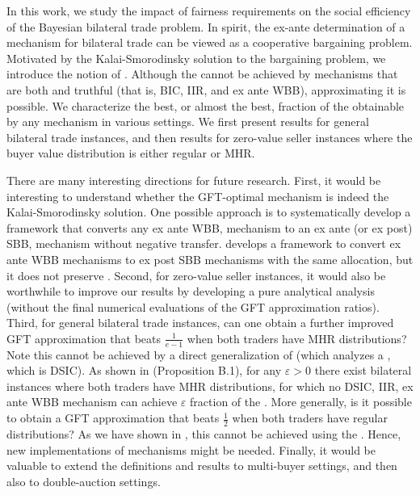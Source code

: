
In this work, we study the impact of fairness requirements on the social efficiency of the Bayesian bilateral trade problem. In spirit, the ex-ante determination of a mechanism for bilateral trade can be viewed as a cooperative bargaining problem. Motivated by the Kalai-Smorodinsky solution to the bargaining problem, we introduce the notion of {\ksfairness}. Although the {\SecondBest} cannot be achieved by mechanisms that are both {\ksfair} and truthful (that is, BIC, IIR, and ex ante WBB), approximating it is possible. We characterize the best, or almost the best, fraction of the {\SecondBest} obtainable by any {\ksfair} mechanism in various settings. We first present results for general bilateral trade instances, and then results for zero-value seller instances where the buyer value distribution is either regular or MHR.

There are many interesting directions for future research. First, it would be interesting to understand whether the GFT-optimal {\ksfair} mechanism is indeed the Kalai-Smorodinsky solution. One possible approach is to systematically develop a framework that converts any ex ante WBB, {\ksfair} mechanism to an ex ante (or ex post) SBB, {\ksfair} mechanism without negative transfer. \citet{BCW-22} develops a framework to convert ex ante WBB mechanisms to ex post SBB mechanisms with the same allocation, but it does not preserve {\ksfairness}.
Second, for zero-value seller instances, it would also be worthwhile to improve our results by developing a pure analytical analysis (without the final numerical evaluations of the GFT approximation ratios). Third, for general bilateral trade instances, can one obtain a further improved GFT approximation that beats $\frac{1}{e - 1}$ when both traders have MHR distributions? 
Note this cannot be achieved by a direct generalization of  (which analyzes a {\ksfair} {\FixPrice}, which is DSIC). As shown in \citet{BD-21} (Proposition B.1), for any $\varepsilon > 0$  there exist bilateral instances where both traders have MHR distributions, for which no DSIC, IIR, ex ante WBB mechanism can achieve $\varepsilon$ fraction of the {\SecondBest}.
More generally, is it possible to obtain a GFT approximation that beats $\frac{1}{2}$ when both traders have regular distributions? As we have shown in , this cannot be achieved using the {\ksfair} {\BiasedRandomOffer}. Hence, new implementations of {\ksfair} mechanisms might be needed. Finally, it would be valuable to extend the definitions and results to multi-buyer settings, and then also to double-auction settings.
